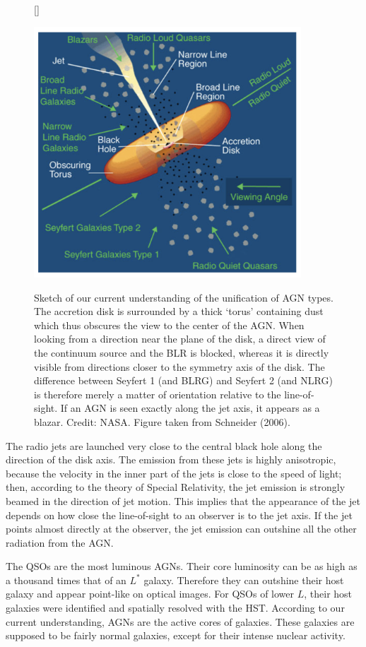 \documentclass[a4paper,11pt]{article}
\begin{document}
\begin{figure}[t]
    [\FBwidth]
    {\caption{\footnotesize{Sketch of our current understanding of the unification of AGN types. The accretion disk is surrounded by a thick `torus' containing dust which thus obscures the view to the center of the AGN. When looking from a direction near the plane of the disk, a direct view of the continuum source and the BLR is blocked, whereas it is directly visible from directions closer to the symmetry axis of the disk. The difference between Seyfert 1 (and BLRG) and Seyfert 2 (and NLRG) is therefore merely a matter of orientation relative to the line-of-sight. If an AGN is seen exactly along the jet axis, it appears as a blazar. Credit: NASA. Figure taken from Schneider (2006).}}
    \label{fig:agn}}
    {\includegraphics[width=10cm]{figures/AGN.png}}
\end{figure}

{\noindent}The radio jets are launched very close to the central black hole along the direction of the disk axis. The emission from these jets is highly anisotropic, because the velocity in the inner part of the jets is close to the speed of light; then, according to the theory of Special Relativity, the jet emission is strongly beamed in the direction of jet motion. This implies that the appearance of the jet depends on how close the line-of-sight to an observer is to the jet axis. If the jet points almost directly at the observer, the jet emission can outshine all the other radiation from the AGN. 

{\noindent}The QSOs are the most luminous AGNs. Their core luminosity can be as high as a thousand times that of an $L^*$  galaxy. Therefore they can outshine their host galaxy and appear point-like on optical images. For QSOs of lower $L$, their host galaxies were identified and spatially resolved with the HST. According to our current understanding, AGNs are the active cores of galaxies. These galaxies are supposed to be fairly normal galaxies, except for their intense nuclear activity.
\end{document}
